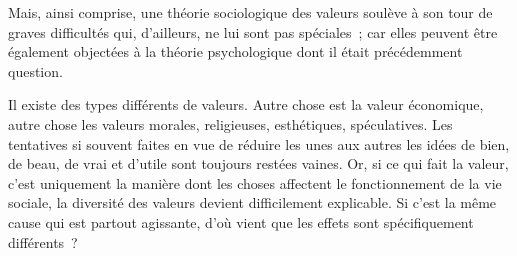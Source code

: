 \documentclass[french,twoside]{book} %
\begin{document}
Mais, ainsi comprise, une théorie sociologique des valeurs soulève à son tour de graves difficultés qui, d’ailleurs, ne lui sont pas spéciales ; car elles peuvent être également objectées à la théorie psychologique dont il était précédemment question.\par
Il existe des types différents de valeurs. Autre chose est la valeur économique, autre chose les valeurs morales, religieuses, esthétiques, spéculatives. Les tentatives si souvent faites en vue de réduire les unes aux autres les idées de bien, de beau, de vrai et d’utile sont toujours restées vaines. Or, si ce qui fait la valeur, c’est uniquement la manière dont les choses affectent le fonctionnement de la vie sociale, la diversité des valeurs devient difficilement explicable. Si c’est la même cause qui est partout agissante, d’où vient que les effets sont spécifiquement différents ?\par
\end{document}
